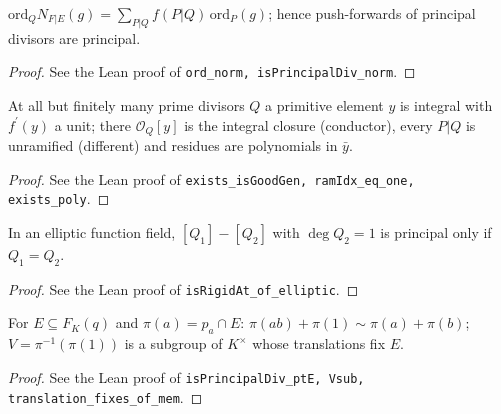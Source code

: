 \begin{lemma}
\label{lem:ff-norm}
\leanok
$\mathrm{ord}_Q N_{F|E}(g)=\sum_{P|Q} f(P|Q)\,\mathrm{ord}_P(g)$; hence push-forwards of principal divisors are principal.
\end{lemma}
\begin{proof}
\leanok
See the Lean proof of \texttt{ord\_norm, isPrincipalDiv\_norm}.
\end{proof}

\begin{lemma}
\label{lem:ff-unramified}
\leanok
At all but finitely many prime divisors $Q$ a primitive element $y$ is integral with $f^\prime(y)$ a unit; there $\mathcal O_Q[y]$ is the integral closure (conductor), every $P|Q$ is unramified (different) and residues are polynomials in $\bar y$.
\end{lemma}
\begin{proof}
\leanok
See the Lean proof of \texttt{exists\_isGoodGen, ramIdx\_eq\_one, exists\_poly}.
\end{proof}

\begin{lemma}
\label{lem:genus-one-rigid}
\leanok
In an elliptic function field, $[Q_1]-[Q_2]$ with $\deg Q_2=1$ is principal only if $Q_1=Q_2$.
\end{lemma}
\begin{proof}
\leanok
See the Lean proof of \texttt{isRigidAt\_of\_elliptic}.
\end{proof}

\begin{lemma}
\label{lem:XVIII-points}
\leanok
For $E\subseteq F_K(q)$ and $\pi(a)=p_a\cap E$: $\pi(ab)+\pi(1)\sim\pi(a)+\pi(b)$; $V=\pi^{-1}(\pi(1))$ is a subgroup of $K^\times$ whose translations fix $E$.
\end{lemma}
\begin{proof}
\leanok
See the Lean proof of \texttt{isPrincipalDiv\_ptE, Vsub, translation\_fixes\_of\_mem}.
\end{proof}

